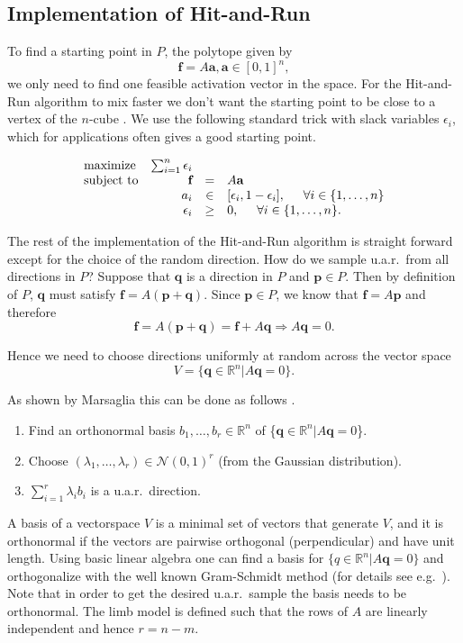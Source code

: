 \subsection*{Implementation of Hit-and-Run}
To find a starting point in $P$, the polytope given by
\[\textbf{f} = A\textbf{a}, \textbf{a} \in [0,1]^n,\]
we only need to find one feasible activation vector in the space.
For the Hit-and-Run algorithm to mix faster we don't want the starting point to be close to a vertex of the $n$-cube \cite{Lovasz}.
We use the following standard trick with slack variables $\epsilon_i$, which for applications often gives a good starting point.

\begin{equation}\label{eq:LP_r}
\begin{array}{lrcl}
\mbox{maximize} & \sum_{i=1}^n \epsilon_i \\ 
\mbox{subject to} & \textbf{f} &=& A\textbf{a}\\
  & a_i &\in& [\epsilon_i, 1- \epsilon_i], \hspace{5mm} \forall i \in \{1,\dots,n\}  \\
  & \epsilon_i &\geq& 0, \hspace{5mm} \forall i \in \{1,\dots,n\}.  
\end{array}
\end{equation}


The rest of the implementation of the Hit-and-Run algorithm is straight forward except for the choice of the random direction. How do we sample u.a.r.\ from all directions in $P$? Suppose that $\textbf{q}$ is a direction in $P$ and $\textbf{p} \in P$. Then by definition of $P$, $\textbf{q}$ must satisfy $\textbf{f} = A(\textbf{p}+\textbf{q})$. Since $\textbf{p} \in P$, we know that $\textbf{f} = A\textbf{p}$ and therefore 
\[\textbf{f} = A(\textbf{p} + \textbf{q}) = \textbf{f} + A\textbf{q} \Rightarrow A\textbf{q} = 0. \]

Hence we need to choose directions uniformly at random across the vector space 
\[V = \{\textbf{q} \in \mathbb{R}^n | A\textbf{q} = 0\}.\]

As shown by Marsaglia this can be done as follows \cite{Marsaglia}.
\begin{enumerate}
\item
Find an orthonormal basis $b_1, \dots, b_r \in \mathbb{R}^{n}$ of \{$\textbf{q} \in \mathbb{R}^n | A\textbf{q} = 0$\}.
\item
Choose $(\lambda_1, \dots, \lambda_r) \in \mathcal{N}(0,1)^r$ (from the Gaussian distribution).
\item
$\sum_{i=1}^r \lambda_i b_i$ is a u.a.r.\ direction.
\end{enumerate}
A basis of a vectorspace $V$ is a minimal set of vectors that generate $V$, and it is orthonormal if the vectors are pairwise orthogonal (perpendicular) and have unit length. Using basic linear algebra one can find a basis for $\{q \in \mathbb{R}^n | A\textbf{q} = 0\}$ and orthogonalize with the well known Gram-Schmidt method (for details see e.g.\ \cite{Robertson}). Note that in order to get the desired u.a.r.\ sample the basis needs to be orthonormal. The limb model is defined such that the rows of $A$ are linearly independent and hence $r=n-m$.


